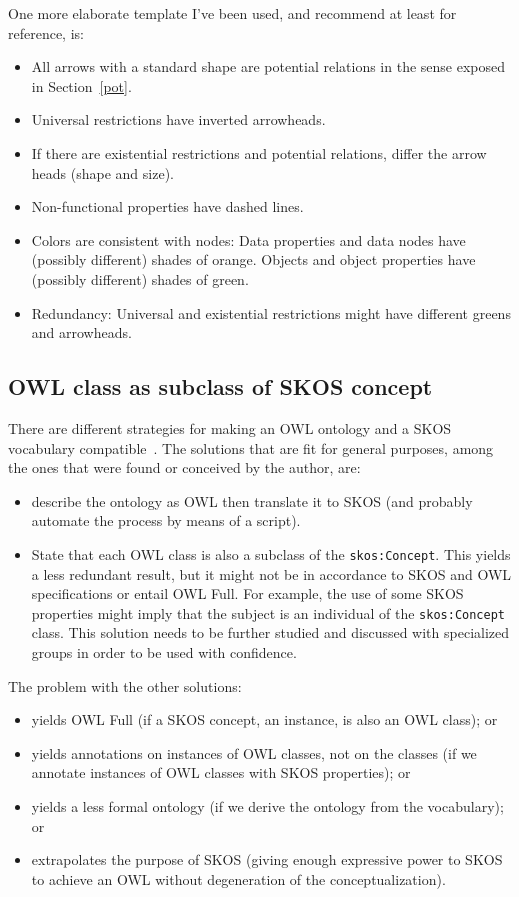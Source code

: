 \documentclass[12pt,fleqn]{article}
\begin{document}
One more elaborate template I've been used, and recommend at least for reference, is:
\begin{itemize}
    \item All arrows with a standard shape are potential relations
        in the sense exposed in Section~\ref{pot}.
    \item Universal restrictions have inverted arrowheads.
    \item If there are existential restrictions and potential relations,
        differ the arrow heads (shape and size).
    \item Non-functional properties have dashed lines.
    \item Colors are consistent with nodes:
        Data properties and data nodes have (possibly different)
        shades of orange.
        Objects and object properties have (possibly different)
        shades of green.
    \item Redundancy: Universal and existential restrictions might
        have different greens and arrowheads.
\end{itemize}

\subsection{OWL class as subclass of SKOS concept}\label{owlSkos}
There are different
strategies for making an OWL ontology and a SKOS vocabulary compatible~\citep{owlSkos}.
The solutions that are fit for general purposes, among the ones that were found or conceived by the author, are:
\begin{itemize}
	\item describe the ontology as OWL then translate it to SKOS (and probably automate the process by means of a script).
	\item State that each OWL class is also a subclass of the \texttt{skos:Concept}.
		This yields a less redundant result, but it might not be in accordance to SKOS and OWL specifications
		or entail OWL Full.
		For example, the use of some SKOS properties might imply that the subject is an individual of the \texttt{skos:Concept} class.
		This solution needs to be further studied and discussed with specialized groups in order to be used with confidence.
\end{itemize}

The problem with the other solutions:
\begin{itemize}
	\item yields OWL Full (if a SKOS concept, an instance, is also an OWL class); or
	\item yields annotations on instances of OWL classes, not on the classes
		(if we annotate instances of OWL classes with SKOS properties); or
	\item yields a less formal ontology (if we derive the ontology from the vocabulary); or
	\item extrapolates the purpose of SKOS
		(giving enough expressive power to SKOS to achieve an OWL without degeneration of the conceptualization).
\end{itemize}
\end{document}
